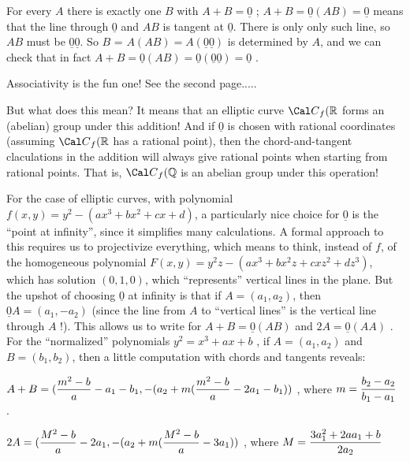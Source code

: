 \ssk

For every $A$ there is exactly one $B$ with $A+B = \underline{0}$ ; 
$A+B = \underline{0}(AB) = \underline{0}$ means that the line through 
$\underline{0}$ and $AB$ is tangent at $\underline{0}$. There is only
only such line, so $AB$ must be $\underline{0}\underline{0}$. So
$B$ = $A(AB) = A(\underline{0}\underline{0})$ is determined by $A$,
and we can check that in fact $A+B = \underline{0}(AB) = \underline{0}(\underline{0}\underline{0}) = \underline{0}$ .

\ssk

Associativity is the fun one! See the second page.....

\ssk

\msk

But what does this mean? It means that  an elliptic curve ${\Cal C}_f({\Bbb R}$ 
forms an (abelian) group under this addition! And if $\underline{0}$ is chosen
with rational coordinates (assuming ${\Cal C}_f({\Bbb R}$ has a rational point),
then the chord-and-tangent claculations in the addition will always give rational
points when starting from rational points. That is, ${\Cal C}_f({\Bbb Q}$ is 
an abelian group under this operation! 

\ssk

For the case of elliptic curves, with polynomial $f(x,y) = y^2-(ax^3+bx^2+cx+d)$, 
a particularly nice choice for $\underline{0}$ is the ``point at infinity'', since it simplifies 
many calculations. A formal approach to this requires us to projectivize everything,
which means to think, instead of $f$, of the homogeneous polynomial 
$F(x,y) = y^2z-(ax^3+bx^2z+cxz^2+dz^3)$, which has solution 
$(0,1,0)$, 
which ``represents'' vertical lines in the plane. But the upshot of choosing 
$\underline{0}$ at infinity is that if $A=(a_1,a_2)$, then $\underline{0}A=(a_1,-a_2)$
(since the line from $A$ to ``vertical lines'' is the vertical line through $A$ !).
This allows us to write  for $A+B = \underline{0}(AB)$
and $2A=\underline{0}(AA)$ . For the ``normalized'' polynomials \hhsk
$y^2=x^3+ax+b$ \hhsk , if $A=(a_1,a_2)$ and $B=(b_1,b_2)$, then
a little computation with chords and tangents reveals:

\ssk

$\displaystyle A+B = ({{m^2-b}\over{a}}-a_1-b_1,-(a_2+m({{m^2-b}\over{a}}-2a_1-b_1))$ , where
$\displaystyle m={{b_2-a_2}\over{b_1-a_1}}$ .

$\displaystyle 2A = ({{M^2-b}\over{a}}-2a_1,-(a_2+m({{M^2-b}\over{a}}-3a_1))$ , where
$\displaystyle M={{3a_1^2+2aa_1+b}\over{2a_2}}$

